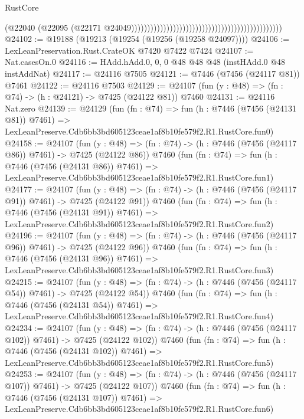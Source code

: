 \begin{lexlean}{RustCore}
\begin{coremodule}
                                                                                            (@22040
                                                                                              (@22095
                                                                                                (@22171
                                                                                                  @24049)))))))))))))))))))))))))))))))))))))))))))))))
@24102 := @19188 (@19213 (@19254 (@19256 (@19258 @24097))))
@24106 := LexLeanPreservation.Rust.CrateOK @7420 @7422 @7424
@24107 := Nat.casesOn.{0}
@24116 := HAdd.hAdd.{0, 0, 0} @48 @48 @48 (instHAdd.{0} @48 instAddNat)
@24117 := @24116 @7505
@24121 := @7446 (@7456 (@24117 @81)) @7461
@24122 := @24116 @7503
@24129 := @24107 (fun (y : @48) => (fn : @74) -> (h : @24121) -> @7425 (@24122 @81)) @7460
@24131 := @24116 Nat.zero
@24139 := @24129
    (fun (fn : @74) =>
    fun (h : @7446 (@7456 (@24131 @81)) @7461) =>
    LexLeanPreserve.Cdb6bb3bd605123ceae1af8b10fe579f2.R1.RustCore.fun0)
@24158 := @24107
    (fun (y : @48) => (fn : @74) -> (h : @7446 (@7456 (@24117 @86)) @7461) -> @7425 (@24122 @86))
    @7460
    (fun (fn : @74) =>
    fun (h : @7446 (@7456 (@24131 @86)) @7461) =>
    LexLeanPreserve.Cdb6bb3bd605123ceae1af8b10fe579f2.R1.RustCore.fun1)
@24177 := @24107
    (fun (y : @48) => (fn : @74) -> (h : @7446 (@7456 (@24117 @91)) @7461) -> @7425 (@24122 @91))
    @7460
    (fun (fn : @74) =>
    fun (h : @7446 (@7456 (@24131 @91)) @7461) =>
    LexLeanPreserve.Cdb6bb3bd605123ceae1af8b10fe579f2.R1.RustCore.fun2)
@24196 := @24107
    (fun (y : @48) => (fn : @74) -> (h : @7446 (@7456 (@24117 @96)) @7461) -> @7425 (@24122 @96))
    @7460
    (fun (fn : @74) =>
    fun (h : @7446 (@7456 (@24131 @96)) @7461) =>
    LexLeanPreserve.Cdb6bb3bd605123ceae1af8b10fe579f2.R1.RustCore.fun3)
@24215 := @24107
    (fun (y : @48) => (fn : @74) -> (h : @7446 (@7456 (@24117 @54)) @7461) -> @7425 (@24122 @54))
    @7460
    (fun (fn : @74) =>
    fun (h : @7446 (@7456 (@24131 @54)) @7461) =>
    LexLeanPreserve.Cdb6bb3bd605123ceae1af8b10fe579f2.R1.RustCore.fun4)
@24234 := @24107
    (fun (y : @48) => (fn : @74) -> (h : @7446 (@7456 (@24117 @102)) @7461) -> @7425 (@24122 @102))
    @7460
    (fun (fn : @74) =>
    fun (h : @7446 (@7456 (@24131 @102)) @7461) =>
    LexLeanPreserve.Cdb6bb3bd605123ceae1af8b10fe579f2.R1.RustCore.fun5)
@24253 := @24107
    (fun (y : @48) => (fn : @74) -> (h : @7446 (@7456 (@24117 @107)) @7461) -> @7425 (@24122 @107))
    @7460
    (fun (fn : @74) =>
    fun (h : @7446 (@7456 (@24131 @107)) @7461) =>
    LexLeanPreserve.Cdb6bb3bd605123ceae1af8b10fe579f2.R1.RustCore.fun6)

\end{coremodule}
\end{lexlean}
